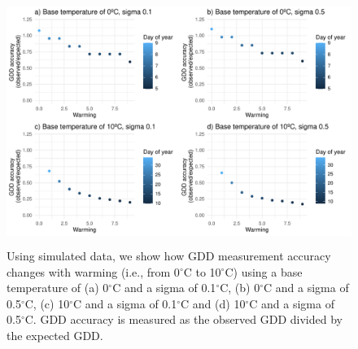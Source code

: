 \documentclass{article}\usepackage[]{graphicx}\usepackage[]{color}
\begin{document}
\begin{figure}[H]
    \centering
    \includegraphics[height=8cm, width=12cm]{..//analyses/figures/gddratio_warming.pdf}
\caption{Using simulated data, we show how GDD measurement accuracy changes with warming (i.e., from 0$^{\circ}$C to 10$^{\circ}$C) using a base temperature of (a) 0$^{\circ}$C and a sigma of 0.1$^{\circ}$C, (b) 0$^{\circ}$C and a sigma of 0.5$^{\circ}$C, (c) 10$^{\circ}$C and a sigma of 0.1$^{\circ}$C and (d) 10$^{\circ}$C and a sigma of 0.5$^{\circ}$C. GDD accuracy is measured as the observed GDD divided by the expected GDD. }
\label{fig:warming}
\end{figure}

  
  
\end{document}
